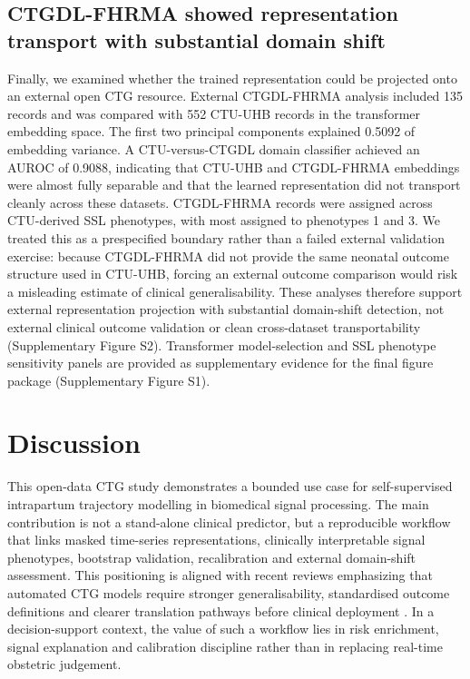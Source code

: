 \documentclass[11pt]{article}
\begin{document}
\subsection{CTGDL-FHRMA showed representation transport with substantial domain shift}

Finally, we examined whether the trained representation could be projected onto an external open CTG resource. External CTGDL-FHRMA analysis included 135 records and was compared with 552 CTU-UHB records in the transformer embedding space. The first two principal components explained 0.5092 of embedding variance. A CTU-versus-CTGDL domain classifier achieved an AUROC of 0.9088, indicating that CTU-UHB and CTGDL-FHRMA embeddings were almost fully separable and that the learned representation did not transport cleanly across these datasets. CTGDL-FHRMA records were assigned across CTU-derived SSL phenotypes, with most assigned to phenotypes 1 and 3. We treated this as a prespecified boundary rather than a failed external validation exercise: because CTGDL-FHRMA did not provide the same neonatal outcome structure used in CTU-UHB, forcing an external outcome comparison would risk a misleading estimate of clinical generalisability. These analyses therefore support external representation projection with substantial domain-shift detection, not external clinical outcome validation or clean cross-dataset transportability (Supplementary Figure S2). Transformer model-selection and SSL phenotype sensitivity panels are provided as supplementary evidence for the final figure package (Supplementary Figure S1).

\section{Discussion}

This open-data CTG study demonstrates a bounded use case for self-supervised intrapartum trajectory modelling in biomedical signal processing. The main contribution is not a stand-alone clinical predictor, but a reproducible workflow that links masked time-series representations, clinically interpretable signal phenotypes, bootstrap validation, recalibration and external domain-shift assessment. This positioning is aligned with recent reviews emphasizing that automated CTG models require stronger generalisability, standardised outcome definitions and clearer translation pathways before clinical deployment \cite{mendis2023,francis2024}. In a decision-support context, the value of such a workflow lies in risk enrichment, signal explanation and calibration discipline rather than in replacing real-time obstetric judgement.
\end{document}
